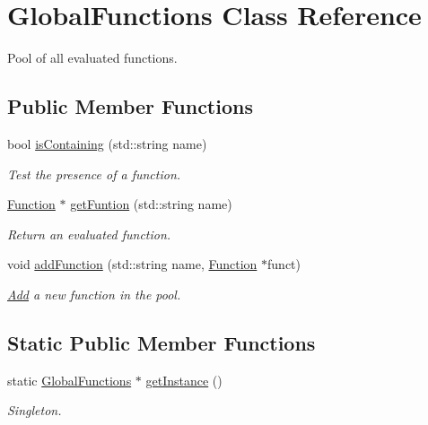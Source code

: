 \hypertarget{class_global_functions}{\section{Global\-Functions Class Reference}
\label{class_global_functions}
}


Pool of all evaluated functions.  


\subsection*{Public Member Functions}
\begin{DoxyCompactItemize}
\item 
bool \hyperlink{class_global_functions_acef0e746c933a653d646c011386e2751}{is\-Containing} (std\-::string name)
\begin{DoxyCompactList}\small\item\em Test the presence of a function. \end{DoxyCompactList}\item 
\hyperlink{class_function}{Function} $\ast$ \hyperlink{class_global_functions_a22419333b2eadadb78d3e4022cc39fb2}{get\-Funtion} (std\-::string name)
\begin{DoxyCompactList}\small\item\em Return an evaluated function. \end{DoxyCompactList}\item 
void \hyperlink{class_global_functions_a9f41b87b5aae62b5e986a74f6bc34754}{add\-Function} (std\-::string name, \hyperlink{class_function}{Function} $\ast$funct)
\begin{DoxyCompactList}\small\item\em \hyperlink{class_add}{Add} a new function in the pool. \end{DoxyCompactList}\end{DoxyCompactItemize}
\subsection*{Static Public Member Functions}
\begin{DoxyCompactItemize}
\item 
\hypertarget{class_global_functions_a3ea0c14884cd6361b38755906113598b}{static \hyperlink{class_global_functions}{Global\-Functions} $\ast$ \hyperlink{class_global_functions_a3ea0c14884cd6361b38755906113598b}{get\-Instance} ()}\label{class_global_functions_a3ea0c14884cd6361b38755906113598b}

\begin{DoxyCompactList}\small\item\em Singleton. \end{DoxyCompactList}\end{DoxyCompactItemize}


